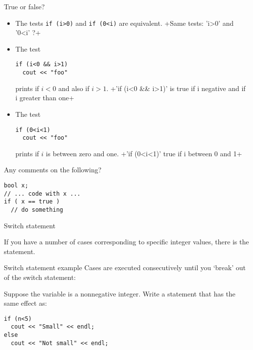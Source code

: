 \begin{review}
  \label{q:if}
  True or false?
  \begin{itemize}
  \item The tests \lstinline$if (i>0)$ and \lstinline$if (0<i)$ are equivalent.
    \slackpollTF+Same tests: 'i>0' and '0<i' ?+
  \item The test
\begin{lstlisting}
if (i<0 && i>1) 
  cout << "foo"
\end{lstlisting}
    prints  if
    $i<0$ and also if $i>1$.
    \slackpollTF+'if (i<0 && i>1)' is true if i negative and if i greater than one+
  \item The test 
\begin{lstlisting}
if (0<i<1)
  cout << "foo"
\end{lstlisting}
prints  if $i$ is
    between zero and one.
    \slackpollTF+'if (0<i<1)' true if i between 0 and 1+
  \end{itemize}
\end{review}

\begin{review}
  \label{q:true}
  Any comments on the following?
\begin{lstlisting}
bool x;
// ... code with x ...
if ( x == true )
  // do something
\end{lstlisting}
  
\end{review}

 {Switch statement}

If you have a number of cases corresponding to specific integer
values, there is the  statement.

\begin{block}{Switch statement example}
  \label{sl:switch}
  Cases are executed consecutively until you `break' out of the switch
  statement:
  \renewcommand\snippetcodefraction{.5}
  \renewcommand\snippetanswfraction{.48}
\end{block}

\begin{exercise}
  \label{ex:switch-range}
  Suppose the variable  is a nonnegative integer. Write a
   statement that has the same effect as:
\begin{lstlisting}
if (n<5)
  cout << "Small" << endl;
else
  cout << "Not small" << endl;
\end{lstlisting}
\end{exercise}

